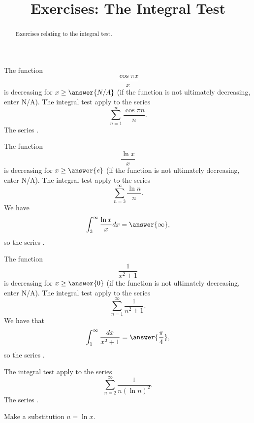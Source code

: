 \documentclass{ximera}
\title{Exercises: The Integral Test}
\begin{document}
\begin{abstract}
Exercises relating to the integral test.
\end{abstract}
\maketitle



\begin{exercise}
The function
\[ \frac{\cos \pi x}{x} \]
is decreasing for $x \geq \answer{N/A}$ (if the function is not ultimately decreasing, enter N/A). The integral test  apply to the series
\[ \sum_{n=1}^\infty \frac{\cos \pi n}{n}. \]
The series .
\end{exercise}

\begin{exercise}
The function \[ \frac{\ln x}{x} \]
is decreasing for $x \geq \answer{e}$ (if the function is not ultimately decreasing, enter N/A). The integral test  apply to the series
\[ \sum_{n=3}^\infty \frac{\ln n}{n}. \]
We have
\[ \int_3^\infty \frac{\ln x}{x} dx = \answer{\infty}, \]
so the series .
\end{exercise}

\begin{exercise}
The function \[ \frac{1}{x^2+1} \]
is decreasing for $x \geq \answer{0}$ (if the function is not ultimately decreasing, enter N/A). The integral test  apply to the series
\[ \sum_{n=1}^\infty \frac{1}{n^2+1}. \]
We have that
\[ \int_1^\infty \frac{dx}{x^2 + 1} = \answer{\frac{\pi}{4}}, \]
so the series .
\end{exercise}

\begin{exercise}
The integral test 
 apply to the series
\[ \sum_{n=2}^\infty \frac{1}{n (\ln n)^2}. \]
The series .
\begin{hint}
Make a substitution $u = \ln x$.
\end{hint}
\end{exercise}
\end{document}
